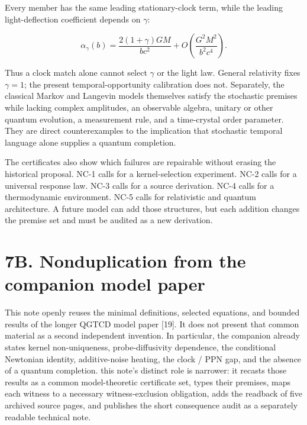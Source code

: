 \documentclass[
  american,
  11pt,
  letterpaper,
]{article}
\begin{document}
Every member has the same leading stationary-clock term, while the leading light-deflection coefficient depends on \(\gamma\):

\begin{equation}
\alpha_\gamma(b)=\frac{2(1+\gamma)GM}{bc^2}
+O\!\left(\frac{G^2M^2}{b^2c^4}\right).
\tag{18}
\end{equation}

Thus a clock match alone cannot select \(\gamma\) or the light law. General relativity fixes \(\gamma=1\); the present temporal-opportunity calibration does not. Separately, the classical Markov and Langevin models themselves satisfy the stochastic premises while lacking complex amplitudes, an observable algebra, unitary or other quantum evolution, a measurement rule, and a time-crystal order parameter. They are direct counterexamples to the implication that stochastic temporal language alone supplies a quantum completion.

The certificates also show which failures are repairable without erasing the historical proposal. NC-1 calls for a kernel-selection experiment. NC-2 calls for a universal response law. NC-3 calls for a source derivation. NC-4 calls for a thermodynamic environment. NC-5 calls for relativistic and quantum architecture. A future model can add those structures, but each addition changes the premise set and must be audited as a new derivation.

\section{7B. Nonduplication from the companion model paper}\label{b.-nonduplication-from-the-companion-model-paper}

This note openly reuses the minimal definitions, selected equations, and bounded results of the longer QGTCD model paper {[}19{]}. It does not present that common material as a second independent invention. In particular, the companion already states kernel non-uniqueness, probe-diffusivity dependence, the conditional Newtonian identity, additive-noise heating, the clock / PPN gap, and the absence of a quantum completion. this note's distinct role is narrower: it recasts those results as a common model-theoretic certificate set, types their premises, maps each witness to a necessary witness-exclusion obligation, adds the readback of five archived source pages, and publishes the short consequence audit as a separately readable technical note.
\end{document}
